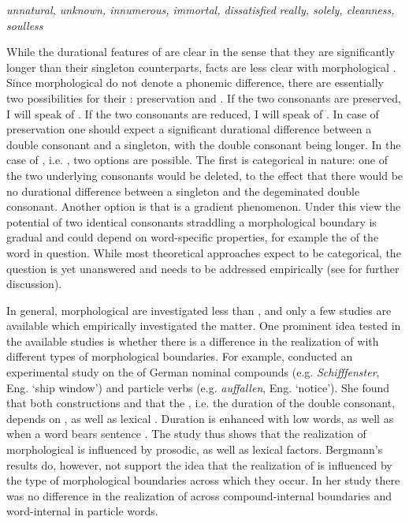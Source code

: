 \begin{exe} 
	\ex \label{example gemination 1} \textit{unnatural, unknown, innumerous, immortal, dissatisfied}
	\ex \label{example gemination 2}\textit{really, solely, cleanness, soulless}
\end{exe}

While the durational features of  are clear in the sense that they are significantly longer than their singleton counterparts, facts are less clear with morphological . Since morphological  do not denote a phonemic difference, there are essentially two possibilities for their : preservation and . If the two consonants are preserved, I will speak of . If the two consonants are reduced, I will speak of . 
In case of preservation one should expect a significant durational difference between a double consonant and a singleton, with the double consonant being longer.	
In the case of , i.e. , two options are possible. The first is categorical in nature: one of the two underlying consonants would be deleted, to the effect that there would be no durational difference between a singleton and the degeminated double consonant.
Another option is that  is a gradient phenomenon. Under this view the potential  of two identical consonants straddling a morphological boundary is gradual and could depend on word-specific properties, for example the  of the word in question. 
While most theoretical approaches expect  to be categorical, the question is yet unanswered and needs to be addressed empirically (see  for further discussion).

In general, morphological  are investigated less than , and only a few studies are available which empirically investigated the matter. One prominent idea tested in the available studies is whether there is a difference in the realization of  with different types of morphological boundaries.
 For example, \cite{Bergmann.2017} conducted an experimental study on the  of German nominal compounds (e.g. \textit{Schifffenster}, Eng. ‘{ship window}') and  particle verbs (e.g. \textit{auffallen}, Eng.  ‘{notice}'). She found that both constructions  and that the , i.e. the duration of the double consonant, depends on , as well as lexical . Duration is enhanced with low  words, as well as when a word bears sentence . The study thus shows that the realization of morphological  is influenced by prosodic, as well as lexical factors. Bergmann's results do, however, not support the idea that the realization of  is influenced by the type of morphological boundaries across which they occur. In her study there was no difference in the realization of  across compound-internal boundaries and word-internal  in particle words.


